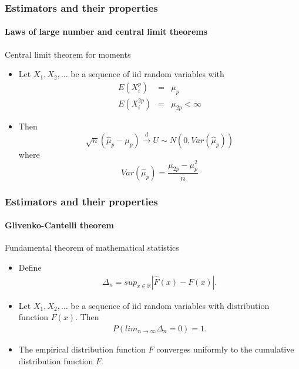 \documentclass[notes=show]{beamer}
\begin{document}
\begin{frame}\frametitle{Estimators and their properties}\framesubtitle{Laws of large number and central limit theorems}
Central limit theorem for moments
\begin{itemize}
    \item Let $X_{1},X_{2},\ldots $ be a sequence of iid random variables with
    \begin{eqnarray*}
        E(X_{i}^{p}) &=&\mu_{p} \\
        E(X_{i}^{2p}) &=&\mu_{2p}<\infty
    \end{eqnarray*}
\item Then
    \begin{equation*}
            \sqrt{n}\left( \hat{\mu}_{p}-\mu _{p}\right) \overset{d}{\rightarrow }U\sim N(0,Var\left( \hat{\mu}_{p}\right) )
    \end{equation*}
    where
    \begin{equation*}
        Var\left( \hat{\mu}_{p}\right) =\frac{\mu _{2p}-\mu _{p}^{2}}{n}
    \end{equation*}
\end{itemize}
\end{frame}


\begin{frame}\frametitle{Estimators and their properties}\framesubtitle{Glivenko-Cantelli theorem}
Fundamental theorem of mathematical statistics
\begin{itemize}
  \item Define
    \begin{align*}
      \Delta_n = sup_{x\in\mathbb{R}} \left|\hat{F}(x) - F(x) \right|.
    \end{align*}
  \item Let $X_{1},X_{2},\ldots $ be a sequence of iid random variables with distribution function $F(x)$. Then
      \begin{align*}
        P\left(lim_{n\rightarrow \infty} \Delta_n = 0\right) =1.
      \end{align*}
  \item The empirical distribution function $\hat{F}$ converges uniformly to the cumulative distribution function $F$.
\end{itemize}
\end{frame}
\end{document}
